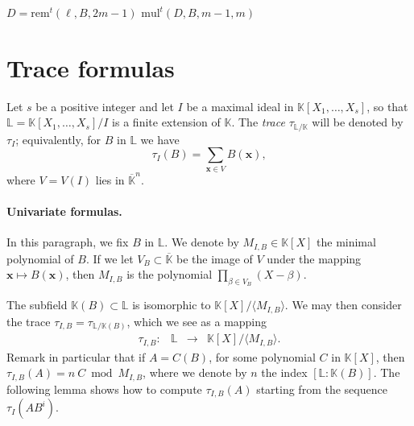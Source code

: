 \documentclass[12pt]{article}
\def\K {\ensuremath{\mathbb{K}}}
\def\Kbar {\ensuremath{\overline{\mathbb{K}}}}
\def\L {\ensuremath{\mathbb{L}}}
\def\mul {\ensuremath{\mathrm{mul}}}
\def\rem {\ensuremath{\mathrm{rem}}}
\def\mulmod {\ensuremath{\mathrm{mulmod}}}
\def\x {\ensuremath{\mathbf{x}}}
\begin{document}
\begin{algorithm}[H]
  \caption{$\mulmod^t(\ell,B,P)$}
  \begin{algorithmic}[1]
    \STATE $D = \rem^t(\ell,B,2m-1)$
    \RETURN $\mul^t(D, B, m-1, m)$
  \end{algorithmic}
\end{algorithm}


\section{Trace formulas} 

Let $s$ be a positive integer and let $I$ be a maximal ideal in
$\K[X_1,\dots,X_s]$, so that $\L=\K[X_1,\dots,X_s]/I$ is a finite
extension of $\K$.  The {\em trace} $\tau_{\L/\K}$ will be denoted by
$\tau_I$; equivalently, for $B$ in $\L$ we have
\begin{equation}\label{eq:tr}
\tau_{I}(B)=\sum_{\x \in V} B(\x),
\end{equation}
where $V=V(I)$ lies in $\Kbar^n$. 

\paragraph{Univariate formulas.} In this paragraph, we fix $B$ in $\L$.
We denote by $M_{I,B} \in \K[X]$ the minimal
polynomial of $B$. If we let $V_B \subset \Kbar$ be the image of $V$
under the mapping $\x \mapsto B(\x)$, then $M_{I,B}$ is the polynomial
$\prod_{\beta \in V_B}(X-\beta)$.

The subfield $\K(B) \subset \L$ is isomorphic to
$\K[X]/\langle M_{I,B} \rangle$. We may then consider the trace
$\tau_{I,B}=\tau_{\L/\K(B)}$, which we see as a mapping
$$
\begin{array}{cccc}
\tau_{I,B} :& \L& \to& \K[X]/\langle M_{I,B} \rangle.
\end{array}$$
Remark in particular that if $A=C(B)$, for some polynomial $C$ in
$\K[X]$, then $\tau_{I,B}(A)=n \ C \bmod M_{I,B}$, where we denote by
$n$ the index $[\L:\K(B)]$. The following lemma shows how to compute
$\tau_{I,B} (A)$ starting from the sequence $\tau_I(A B^i)$.
\end{document}
